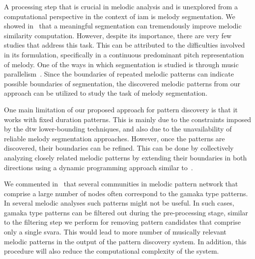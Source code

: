A processing step that is crucial in melodic analysis and is unexplored from a computational perspective in the context of \gls{iam} is melody segmentation. We showed in~ that a meaningful segmentation can tremendously improve melodic similarity computation. However, despite its importance, there are very few studies that address this task. This can be attributed to the difficulties involved in its formulation, specifically in a continuous predominant pitch representation of melody. One of the ways in which segmentation is studied is through music parallelism~\citep{Cambouropoulos2006,rodriguez2014comparing}. Since the boundaries of repeated melodic patterns can indicate possible boundaries of segmentation, the discovered melodic patterns from our approach can be utilized to study the task of melody segmentation.   

One main limitation of our proposed approach for pattern discovery is that it works with fixed duration patterns. This is mainly due to the constraints imposed by the \gls{dtw} lower-bounding techniques, and also due to the unavailability of reliable melody segmentation approaches. However, once the patterns are discovered, their boundaries can be refined. This can be done by collectively analyzing closely related melodic patterns by extending their boundaries in both directions using a dynamic programming approach similar to~\cite{muscariello2009variability}.

We commented in~ that several communities in melodic pattern network that comprise a large number of nodes often correspond to the \gls{gamaka} type patterns. In several melodic analyses such patterns might not be useful. In such cases, \gls{gamaka} type patterns can be filtered out during the pre-processing stage, similar to the filtering step we perform for removing pattern candidates that comprise only a single \gls{svara}. This would lead to more number of musically relevant melodic patterns in the output of the pattern discovery system. In addition, this procedure will also reduce the computational complexity of the system.

